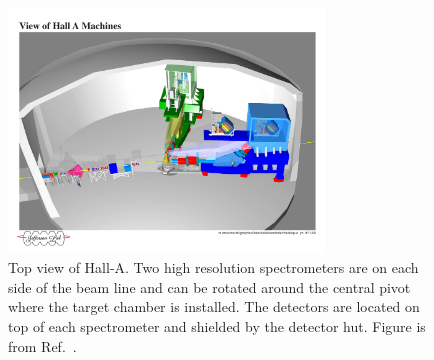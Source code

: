 \begin{figure}[!ht]
 \begin{center}
  \includegraphics[width=0.75\textwidth]{./figures/halla_jlab/hallatop}
  \caption[Top view of Hall-A]{Top view of Hall-A. Two high resolution spectrometers are on each side of the beam line and can be rotated around the central pivot where the target chamber is installed. The detectors are located on top of each spectrometer and shielded by the detector hut.  Figure is from Ref.~\cite{halla_main}.}
  \label{topview}
 \end{center}
\end{figure}

